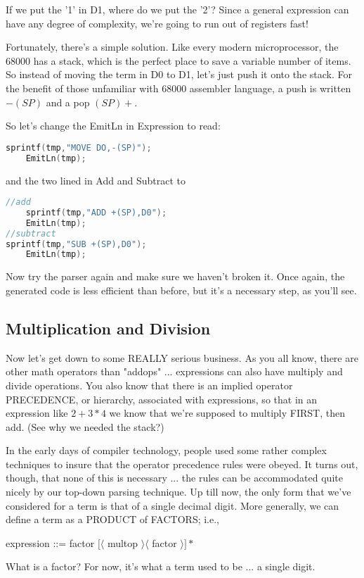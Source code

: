 If we put the '1' in D1, where do we put the '2'? Since a
general expression can have any degree of complexity, we're going
to run out of registers fast!

Fortunately, there's a simple solution. Like every modern
microprocessor, the 68000 has a stack, which is the perfect place
to save a variable number of items. So instead of moving the term
in D0 to D1, let's just push it onto the stack. For the benefit
of those unfamiliar with 68000 assembler language, a push is
written $-(SP)$ and a pop $(SP)+$.

So let's change the EmitLn in Expression to read:
\begin{lstlisting}[language=C]
	sprintf(tmp,"MOVE DO,-(SP)");
	EmitLn(tmp);
\end{lstlisting}
and the two lined in Add and Subtract to
\begin{lstlisting}[language=C]
//add
	sprintf(tmp,"ADD +(SP),D0");
	EmitLn(tmp);
//subtract
sprintf(tmp,"SUB +(SP),D0");
	EmitLn(tmp);	
\end{lstlisting}
Now try the parser again and make sure we haven't
broken it. Once again, the generated code is less efficient than before, but
it's a necessary step, as you'll see.

\subsection{Multiplication and Division}
Now let's get down to some REALLY serious business. As you all
know, there are other math operators than "addops" ...
expressions can also have multiply and divide operations. You
also know that there is an implied operator PRECEDENCE, or
hierarchy, associated with expressions, so that in an expression
like $2+3*4$ we know that we're supposed to multiply FIRST, then add. (See
why we needed the stack?)

In the early days of compiler technology, people used some rather
complex techniques to insure that the operator precedence rules
were obeyed. It turns out, though, that none of this is
necessary ... the rules can be accommodated quite nicely by our
top-down parsing technique. Up till now, the only form that
we've considered for a term is that of a single decimal digit.
More generally, we can define a term as a PRODUCT of FACTORS;
i.e.,


expression ::= factor $[\langle$ multop $\rangle \langle$ factor $\rangle ]*$


What is a factor? For now, it's what a term used to be ... a
single digit.

